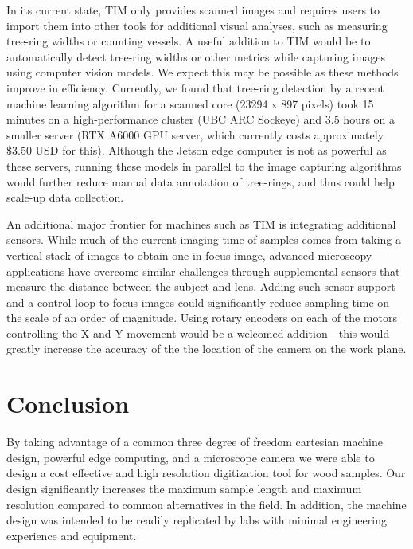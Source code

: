 \documentclass[a4paper,12pt]{article}
\begin{document}
In its current state, TIM only provides scanned images and requires users to import them into other tools for additional visual analyses, such as measuring tree-ring widths or counting vessels.
A useful addition to TIM would be to automatically detect tree-ring widths or other metrics while capturing images using computer vision models. We expect this may be possible as these methods improve in efficiency. Currently, we found that tree-ring detection by a recent machine learning algorithm  \citeauthor[R-CNN presented by][]{polacek_automation_2023} for a scanned core (23294 x 897 pixels) took 15 minutes on a high-performance cluster (UBC ARC Sockeye) and 3.5 hours on a smaller server (RTX A6000 GPU server, which currently costs approximately \$3.50 USD for this). %
Although the Jetson edge computer is not as powerful as these servers, running these models in parallel to the image capturing algorithms would further reduce manual data annotation of tree-rings, and thus could help scale-up data collection.

An additional major frontier for machines such as TIM is integrating additional sensors. While much of the current imaging time of samples comes from taking a vertical stack of images to obtain one in-focus image, advanced microscopy applications have overcome similar challenges through supplemental sensors that measure the distance between the subject and lens.
Adding such sensor support and a control loop to focus images could significantly reduce sampling time on the scale of an order of magnitude. 
Using rotary encoders on each of the motors controlling the X and Y movement would be a welcomed addition---this would greatly increase the 
accuracy of the the location of the camera on the work plane.  

\section{Conclusion} %
By taking advantage of a common three degree of freedom cartesian machine design, powerful edge computing, and a microscope camera we were able to design a cost effective and high resolution digitization tool for wood samples. 
Our design significantly increases the maximum sample length and maximum resolution compared to common alternatives in the field. 
In addition, the machine design was intended to be readily replicated by labs with minimal engineering experience and equipment. 
\end{document}
